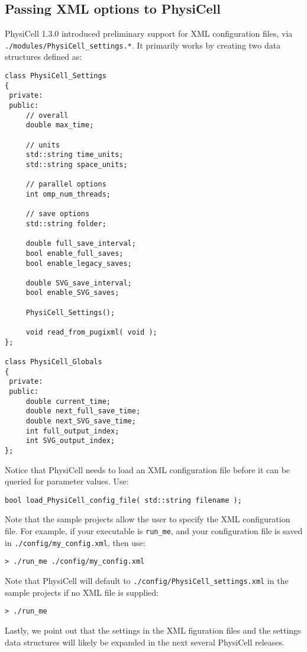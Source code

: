 \documentclass[12pt]{article}
\renewcommand{\v}{\verb}
\begin{document}
\subsection{Passing XML options to PhysiCell}
\label{sec:XML_options}
PhysiCell 1.3.0 introduced preliminary support for XML configuration files, via \hfill\break
\v|./modules/PhysiCell_settings.*|.
It primarily works by creating two data 
structures defined as: 

\begin{verbatim}
class PhysiCell_Settings
{
 private:
 public:
     // overall 
     double max_time;   

     // units
     std::string time_units; 
     std::string space_units; 
 
     // parallel options 
     int omp_num_threads; 
     
     // save options
     std::string folder; 

     double full_save_interval;  
     bool enable_full_saves; 
     bool enable_legacy_saves; 
     
     double SVG_save_interval; 
     bool enable_SVG_saves; 
     
     PhysiCell_Settings();
     
     void read_from_pugixml( void ); 
};

class PhysiCell_Globals
{
 private:
 public:
     double current_time; 
     double next_full_save_time; 
     double next_SVG_save_time; 
     int full_output_index; 
     int SVG_output_index; 
};
\end{verbatim}

Notice that PhysiCell needs to load an XML configuration file 
before it can be queried for parameter values. Use: 

\v|bool load_PhysiCell_config_file( std::string filename );| 

Note that the sample projects allow the user to specify 
the XML configuration file. For example, if your executable is 
\v|run_me|, and your configuration file is saved in 
\v|./config/my_config.xml|, then use: 

\v|> ./run_me ./config/my_config.xml|

Note that PhysiCell will default to \v|./config/PhysiCell_settings.xml| 
in the sample projects if no XML file is supplied: 

\v|> ./run_me |

Lastly, we point out that the settings in the XML figuration files and the settings 
data structures will likely be expanded in the next several PhysiCell releases. 
\end{document}
